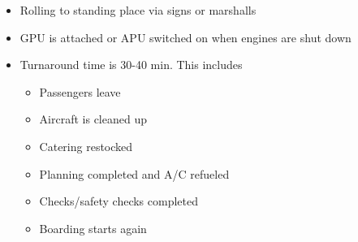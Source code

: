 \documentclass[9pt, landscape, fleqn]{scrartcl}
\begin{document}
\begin{multicols*}{3}
\begin{itemize}
    \item Rolling to standing place via signs or marshalls
    \item GPU is attached or APU switched on when engines are shut down
    \item Turnaround time is 30-40 min. This includes
    \begin{itemize}
        \item Passengers leave
        \item Aircraft is cleaned up 
        \item Catering restocked 
        \item Planning completed and A/C refueled 
        \item Checks/safety checks completed 
        \item Boarding starts again
    \end{itemize} 
\end{itemize}
\newpage

\end{multicols*}
\end{document}
